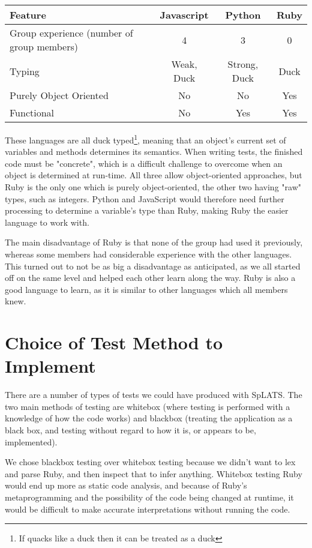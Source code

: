   \begin{tabular}{| l | c | c | c |}
  \hline
  \textbf{Feature} & \textbf{Javascript} & \textbf{Python} & \textbf{Ruby} \\
  \hline
  Group experience (number of group members) & 4 & 3 & 0 \\
  \hline
  Typing & Weak, Duck & Strong, Duck & Duck \\
  \hline
  Purely Object Oriented & No & No & Yes \\
  \hline
  Functional & No & Yes & Yes \\
  \hline
  \end{tabular}
  
These languages are all duck typed\footnote{If quacks like a duck then it can be treated as a duck}, meaning that an object's current set of variables and methods determines its semantics. When writing tests, the finished code must be "concrete", which is a difficult challenge to overcome when an object is determined at run-time.
All three allow object-oriented approaches, but Ruby is the only one which is purely object-oriented, the other two having "raw" types, such as integers. Python and JavaScript would therefore need further processing to determine a variable's type than Ruby, making Ruby the easier language to work with.

The main disadvantage of Ruby is that none of the group had used it previously, whereas some members had considerable experience with the other languages. This turned out to not be as big a disadvantage as anticipated, as we all started off on the same level and helped each other learn along the way. Ruby is also a good language to learn, as it is similar to other languages which all members knew.

\section{Choice of Test Method to Implement}
  There are a number of types of tests we could have produced with SpLATS.
  The two main methods of testing are whitebox (where testing is performed
  with a knowledge of how the code works) and blackbox (treating the
  application as a black box, and testing without regard to how it is, or
  appears to be, implemented).

  We chose blackbox testing over whitebox testing because we didn't want to lex and parse Ruby, and then inspect that to infer anything. Whitebox testing Ruby would end up more as static code analysis, and because of Ruby's metaprogramming and the possibility of the code being changed at runtime, it would be difficult to make accurate interpretations without running the code.

